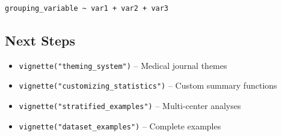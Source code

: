 \documentclass[
]{article}
\providecommand{\tightlist}{%
  \setlength{\itemsep}{0pt}\setlength{\parskip}{0pt}}
\begin{document}
\begin{verbatim}
grouping_variable ~ var1 + var2 + var3
\end{verbatim}

\subsection{Next Steps}\label{next-steps}

\begin{itemize}
\tightlist
\item
  \texttt{vignette("theming\_system")} -- Medical journal themes
\item
  \texttt{vignette("customizing\_statistics")} -- Custom summary
  functions
\item
  \texttt{vignette("stratified\_examples")} -- Multi-center analyses
\item
  \texttt{vignette("dataset\_examples")} -- Complete examples
\end{itemize}
\end{document}
